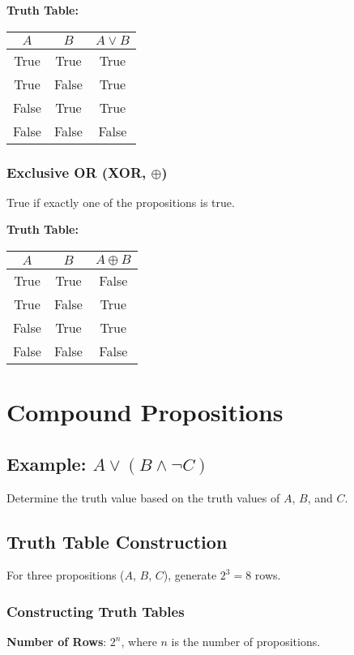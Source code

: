 \documentclass{article}
\begin{document}
\textbf{Truth Table:}
\begin{center}
    \begin{tabular}{|c|c|c|}
        \hline
        $A$ & $B$ & $A \lor B$ \\
        \hline
        True & True & True \\
        True & False & True \\
        False & True & True \\
        False & False & False \\
        \hline
    \end{tabular}
\end{center}

\subsubsection{Exclusive OR (XOR, $\oplus$)}
True if exactly one of the propositions is true.

\textbf{Truth Table:}
\begin{center}
    \begin{tabular}{|c|c|c|}
        \hline
        $A$ & $B$ & $A \oplus B$ \\
        \hline
        True & True & False \\
        True & False & True \\
        False & True & True \\
        False & False & False \\
        \hline
    \end{tabular}
\end{center}

\section{Compound Propositions}

\subsection{Example: $A \lor (B \land \neg C)$}
Determine the truth value based on the truth values of $A$, $B$, and $C$.

\subsection{Truth Table Construction}
For three propositions ($A$, $B$, $C$), generate $2^3 = 8$ rows.

\subsubsection{Constructing Truth Tables}
\textbf{Number of Rows}: $2^n$, where $n$ is the number of propositions.
\end{document}
